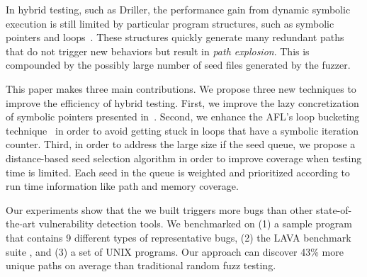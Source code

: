 In hybrid testing, such as Driller, the performance gain from dynamic
symbolic execution is still limited by particular program
structures, such as symbolic pointers and loops~\cite{schwartz2010all,
Boonstoppel:RAP, cadar2011symbolic, baldoni2016survey}. These structures
quickly generate many redundant paths that do not trigger new behaviors
but result in \textit{path explosion}. This is compounded by the possibly
large number of seed files generated by the fuzzer.


This paper makes three main contributions. We propose three new
techniques to improve the efficiency of hybrid testing. First, we
improve the lazy concretization of symbolic pointers presented
in~\cite{chipounov2011s2e}. Second, we enhance the AFL's loop bucketing
technique~\cite{online:afl} in order to avoid getting stuck in loops
that have a symbolic iteration counter. Third, in order to address the
large size if the seed queue, we propose a distance-based seed
selection algorithm in order to improve coverage when testing time is
limited. Each seed in the queue is weighted and prioritized according
to run time information like path and memory coverage.




Our experiments show that the \prototype we built triggers more bugs
than other state-of-the-art vulnerability detection tools. We
benchmarked \prototype on (1) a sample program that contains 9
different types of representative bugs, (2) the LAVA benchmark suite
\cite{dolan2016lava}, and (3) a set of UNIX programs. Our approach can
discover 43\% more unique paths on average than traditional random fuzz
testing.

